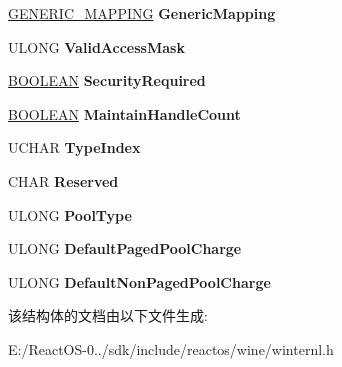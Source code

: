 \begin{DoxyCompactItemize}
\mbox{\label{struct_____o_b_j_e_c_t___t_y_p_e___i_n_f_o_r_m_a_t_i_o_n_a06b7564d4721a89e1e7c893898a163ea}} 
\hyperlink{struct___g_e_n_e_r_i_c___m_a_p_p_i_n_g}{G\+E\+N\+E\+R\+I\+C\+\_\+\+M\+A\+P\+P\+I\+NG} {\bfseries Generic\+Mapping}
\item 
\mbox{\label{struct_____o_b_j_e_c_t___t_y_p_e___i_n_f_o_r_m_a_t_i_o_n_acd574198d4c7d06f92191a4a10480abe}} 
U\+L\+O\+NG {\bfseries Valid\+Access\+Mask}
\item 
\mbox{\label{struct_____o_b_j_e_c_t___t_y_p_e___i_n_f_o_r_m_a_t_i_o_n_a02331d59b23336eaf11921eacb6275f6}} 
\hyperlink{_processor_bind_8h_a112e3146cb38b6ee95e64d85842e380a}{B\+O\+O\+L\+E\+AN} {\bfseries Security\+Required}
\item 
\mbox{\label{struct_____o_b_j_e_c_t___t_y_p_e___i_n_f_o_r_m_a_t_i_o_n_af693df24c4da3a6051051cedadd694dd}} 
\hyperlink{_processor_bind_8h_a112e3146cb38b6ee95e64d85842e380a}{B\+O\+O\+L\+E\+AN} {\bfseries Maintain\+Handle\+Count}
\item 
\mbox{\label{struct_____o_b_j_e_c_t___t_y_p_e___i_n_f_o_r_m_a_t_i_o_n_a90c9934b7e649b4a1ac775dd3f3fb26e}} 
U\+C\+H\+AR {\bfseries Type\+Index}
\item 
\mbox{\label{struct_____o_b_j_e_c_t___t_y_p_e___i_n_f_o_r_m_a_t_i_o_n_a6914ee3c5759e93a6c1c81faceb4ee82}} 
C\+H\+AR {\bfseries Reserved}
\item 
\mbox{\label{struct_____o_b_j_e_c_t___t_y_p_e___i_n_f_o_r_m_a_t_i_o_n_a83cb5470873729b418ec90eb8259cd37}} 
U\+L\+O\+NG {\bfseries Pool\+Type}
\item 
\mbox{\label{struct_____o_b_j_e_c_t___t_y_p_e___i_n_f_o_r_m_a_t_i_o_n_af1d2cd8df260592337b27b4570fb7a1f}} 
U\+L\+O\+NG {\bfseries Default\+Paged\+Pool\+Charge}
\item 
\mbox{\label{struct_____o_b_j_e_c_t___t_y_p_e___i_n_f_o_r_m_a_t_i_o_n_a91e08d42b7ae373e1e3f21a71bf59a8a}} 
U\+L\+O\+NG {\bfseries Default\+Non\+Paged\+Pool\+Charge}
\end{DoxyCompactItemize}


该结构体的文档由以下文件生成\+:\begin{DoxyCompactItemize}
\item 
E\+:/\+React\+O\+S-\/0../sdk/include/reactos/wine/winternl.\+h\end{DoxyCompactItemize}
